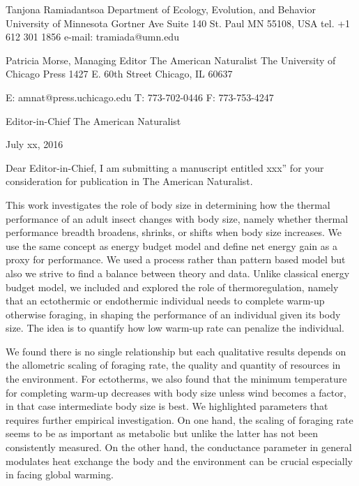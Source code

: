 Tanjona Ramiadantsoa \newline
Department of Ecology, Evolution, and Behavior \newline
University of Minnesota  Gortner Ave Suite 140 \newline
St. Paul MN 55108, USA \newline
tel. +1 612 301 1856 \newline
e-mail: tramiada@umn.edu \newline


Patricia Morse, Managing Editor
The American Naturalist
The University of Chicago Press
1427 E. 60th Street
Chicago, IL 60637

E: amnat@press.uchicago.edu
T: 773-702-0446
F: 773-753-4247


Editor-in-Chief \newline
The American Naturalist  \newline \newline

July xx, 2016 \newline \newline

Dear Editor-in-Chief, \newline
I am submitting a manuscript entitled xxx” for your consideration for publication in The American Naturalist.

This work investigates the role of body size in determining how the thermal performance of an adult insect changes with body size, namely whether thermal performance breadth broadens, shrinks, or shifts when body size increases.
We use the same concept as energy budget model and define net energy gain as a proxy for performance.
We used a process rather than pattern based model but also we strive to find a balance between theory and data.
Unlike classical energy budget model, we included and explored the role of thermoregulation, namely that an ectothermic or endothermic individual needs to complete warm-up otherwise foraging, in shaping the performance of an individual given its body size.
The idea is to quantify how low warm-up rate can penalize the individual.

We found there is no single relationship but each qualitative results depends on the allometric scaling of foraging rate, the quality and quantity of resources in the environment.
For ectotherms, we also found that the minimum temperature for completing warm-up decreases with body size unless wind becomes a factor, in that case intermediate body size is best.
We highlighted parameters that requires further empirical investigation.
On one hand, the scaling of foraging rate seems to be as important as metabolic but unlike the latter has not been consistently measured.
On the other hand, the conductance parameter in general modulates heat exchange the body and the environment can be crucial especially in facing global warming.

